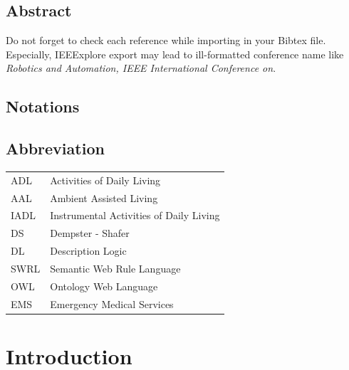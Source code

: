 \documentclass{thesisreport}
\begin{document}
   
 
  \section*{Abstract}
   
 Do not forget to check each reference while importing in your Bibtex file.
 Especially, IEEExplore export may lead to ill-formatted conference name like \emph{Robotics and Automation, 
 IEEE International Conference on}.
 
 \newpage
 
 
\section*{Notations}
 
 \newpage
 
 \section*{Abbreviation}
 
 \begin{tabular}{p{2cm}p{12cm}}
 ADL & Activities of Daily Living\\
 AAL & Ambient Assisted Living \\
 IADL & Instrumental Activities of Daily Living \\
 DS & Dempster - Shafer \\
 DL & Description Logic \\
 SWRL & Semantic Web Rule Language\\
 OWL & Ontology Web Language\\
 EMS & Emergency Medical Services \\
 \end{tabular}
 
 \newpage
 
 \listoffigures
 
 \listoftables
 
 \tableofcontents
 
 
 \chapter*{Introduction}
\end{document}
